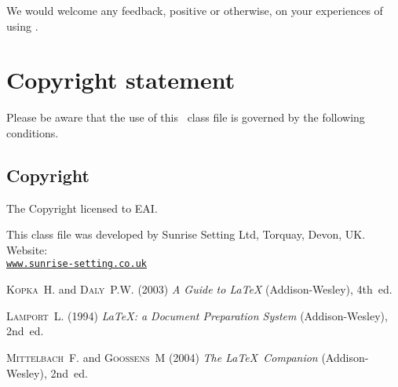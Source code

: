 \documentclass[fonts]{icst}
\begin{document}
We would welcome any feedback, positive or otherwise, on your
experiences of using \textsf{\journalclass}.

\section{Copyright statement}
Please  be  aware that the use of  this \LaTeXe\ class file is
governed by the following conditions.

\subsection{Copyright}
The Copyright licensed to EAI.

\ack This class file was developed by Sunrise Setting Ltd,
Torquay, Devon, UK. Website:\\
\href{http://www.sunrise-setting.co.uk}{\texttt{www.sunrise-setting.co.uk}}

\begin{thebibliography}{9}

 \textsc{Kopka~H.} and \textsc{Daly~P.W.} (2003) \emph{A Guide to \LaTeX}
(Addison-Wesley), 4th~ed.

 \textsc{Lamport~L.} (1994) \emph{\LaTeX: a Document Preparation System}
(Addison-Wesley), 2nd~ed.

 \textsc{Mittelbach~F.} and \textsc{Goossens~M} (2004) \emph{The \LaTeX\ Companion} (Addison-Wesley), 2nd~ed.
\end{thebibliography}
\end{document}
